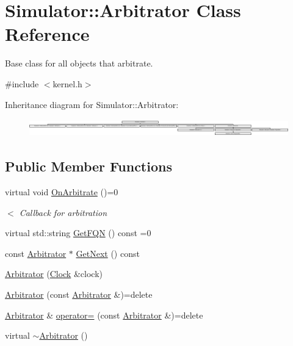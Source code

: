 \hypertarget{class_simulator_1_1_arbitrator}{\section{Simulator\+:\+:Arbitrator Class Reference}
\label{class_simulator_1_1_arbitrator}
}


Base class for all objects that arbitrate.  




{\ttfamily \#include $<$kernel.\+h$>$}

Inheritance diagram for Simulator\+:\+:Arbitrator\+:\begin{figure}[H]
\begin{center}
\leavevmode
\includegraphics[height=0.769231cm]{class_simulator_1_1_arbitrator}
\end{center}
\end{figure}
\subsection*{Public Member Functions}
\begin{DoxyCompactItemize}
\item 
virtual void \hyperlink{class_simulator_1_1_arbitrator_a8cfa3d35f1916c2507b9cc264a7c34ae}{On\+Arbitrate} ()=0
\begin{DoxyCompactList}\small\item\em $<$ Callback for arbitration \end{DoxyCompactList}\item 
virtual std\+::string \hyperlink{class_simulator_1_1_arbitrator_af4942847f33bb218ad9a37fd4cb515ba}{Get\+F\+Q\+N} () const =0
\item 
const \hyperlink{class_simulator_1_1_arbitrator}{Arbitrator} $\ast$ \hyperlink{class_simulator_1_1_arbitrator_a05700337b736b1bb7fb39b2bdf007005}{Get\+Next} () const 
\item 
\hyperlink{class_simulator_1_1_arbitrator_a8835c8e17e2894c90a72f4e1ef72eb0a}{Arbitrator} (\hyperlink{class_simulator_1_1_clock}{Clock} \&clock)
\item 
\hyperlink{class_simulator_1_1_arbitrator_a415268a3985b82af1e0eff6128c0dde0}{Arbitrator} (const \hyperlink{class_simulator_1_1_arbitrator}{Arbitrator} \&)=delete
\item 
\hyperlink{class_simulator_1_1_arbitrator}{Arbitrator} \& \hyperlink{class_simulator_1_1_arbitrator_a6efe8951760ec0040b08dbf7d5ca89e1}{operator=} (const \hyperlink{class_simulator_1_1_arbitrator}{Arbitrator} \&)=delete
\item 
virtual \hyperlink{class_simulator_1_1_arbitrator_a02f0a2135894ecf6bede03ef5cde3b41}{$\sim$\+Arbitrator} ()
\end{DoxyCompactItemize}
